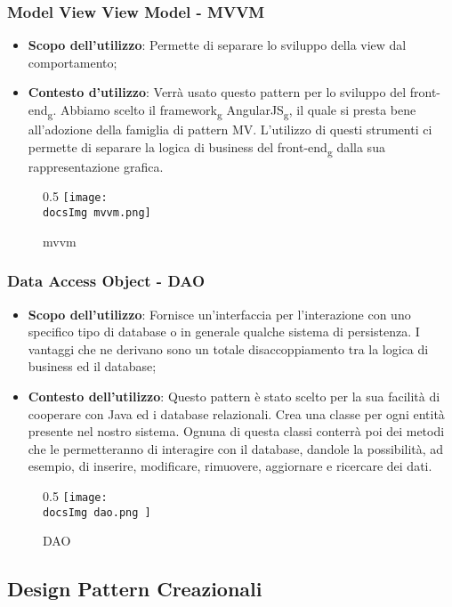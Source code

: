 		\subsubsection{Model View View Model - MVVM}
			\begin{itemize}
				\item \textbf{Scopo dell'utilizzo}: Permette di separare lo sviluppo della view dal comportamento;
				\item \textbf{Contesto d'utilizzo}: Verrà usato questo pattern per lo sviluppo del front-end\textsubscript{g}. Abbiamo scelto il framework\textsubscript{g} AngularJS\textsubscript{g}, il quale si presta bene all'adozione della famiglia di pattern MV. L'utilizzo di questi strumenti ci permette di separare la logica di business del front-end\textsubscript{g} dalla sua rappresentazione grafica.
			\end{itemize}
			\begin{figure}[h]{0.5}
				\centering
				\texttt{[image: \\docsImg mvvm.png]}
				\caption{mvvm}
				\label{fig. Mvvm}
			\end{figure}

		\subsubsection{Data Access Object - DAO }
		\begin{itemize}\itemsep1pt
				\item \textbf{Scopo dell'utilizzo}: Fornisce un'interfaccia per l'interazione con uno specifico tipo di database o in generale qualche sistema di persistenza. I vantaggi che ne derivano sono un totale disaccoppiamento tra la logica di business ed il database;
				\item \textbf{Contesto dell'utilizzo}: Questo pattern è stato scelto per la sua facilità di cooperare con Java ed i database relazionali. Crea una classe per ogni entità presente nel nostro sistema. Ognuna di questa classi conterrà poi dei metodi che le permetteranno di interagire con il database, dandole la possibilità, ad esempio, di inserire, modificare, rimuovere, aggiornare e ricercare dei dati.
		\end{itemize}
		\begin{figure}[h]{0.5}
			\centering
			\texttt{[image: \\docsImg dao.png ]}
			\caption{DAO}
			\label{fig. Data Access Object - DAO}
		\end{figure}
	\subsection{Design Pattern Creazionali}
		
